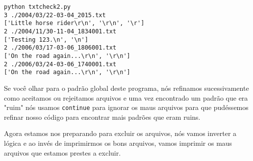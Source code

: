 \beforeverb
\begin{verbatim}
python txtcheck2.py 
3 ./2004/03/22-03-04_2015.txt
['Little horse rider\r\n', '\r\n', '\r']
2 ./2004/11/30-11-04_1834001.txt
['Testing 123.\n', '\n']
2 ./2006/03/17-03-06_1806001.txt
['On the road again...\r\n', '\r\n']
2 ./2006/03/24-03-06_1740001.txt
['On the road again...\r\n', '\r\n']
\end{verbatim}
\afterverb

Se você olhar para o padrão global deste programa, nós refinamos sucessivamente como aceitamos ou rejeitamos arquivos e uma vez encontrado um padrão que era "ruim" nós usamos {\tt continue} para ignorar os maus arquivos para que pudéssemos refinar nosso código para encontrar mais padrões que eram ruins.

Agora estamos nos preparando para excluir os arquivos, nós vamos inverter a lógica e ao invés de imprimirmos os bons arquivos, vamos imprimir os maus arquivos que estamos prestes a excluir.

